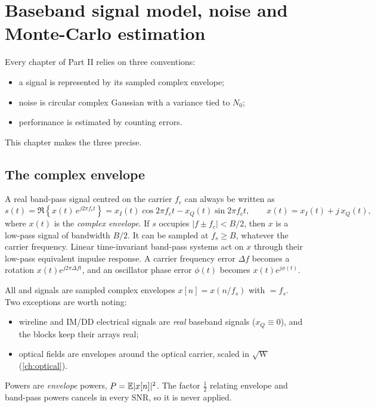 \chapter[Baseband signal model, noise and Monte-Carlo estimation]{Baseband signal model, noise and\\ Monte-Carlo estimation}\label{ch:baseband}

Every chapter of Part II relies on three conventions:
\begin{itemize}
  \item a signal is represented by its sampled complex envelope;
  \item noise is circular complex Gaussian with a variance tied to $N_0$;
  \item performance is estimated by counting errors.
\end{itemize}
This chapter makes the three precise.

\section{The complex envelope}
A real band-pass signal centred on the carrier $f_c$ can always be written as
\begin{equation}
  s(t)=\Re\!\left\{x(t)\,e^{j2\pi f_c t}\right\}=x_I(t)\cos 2\pi f_c t-x_Q(t)\sin 2\pi f_c t,
  \qquad x(t)=x_I(t)+j\,x_Q(t),
  \label{eq:envelope}
\end{equation}
where $x(t)$ is the \emph{complex envelope}. If $s$ occupies $|f\pm f_c|<B/2$, then $x$ is a
low-pass signal of bandwidth $B/2$. It can be sampled at $f_s\ge B$, whatever the carrier
frequency. Linear time-invariant band-pass systems act on $x$ through their low-pass
equivalent impulse response. A carrier frequency error $\Delta f$ becomes a rotation
$x(t)e^{j2\pi\Delta f t}$, and an oscillator phase error $\phi(t)$ becomes $x(t)e^{j\phi(t)}$.

\begin{incode}
All  and  signals are sampled complex envelopes
$x[n]=x(n/f_s)$ with $=f_s$. Two exceptions are worth noting:
\begin{itemize}
  \item wireline and IM/DD electrical signals are \emph{real} baseband signals ($x_Q\equiv0$),
  and the blocks keep their arrays real;
  \item optical fields are envelopes around the optical carrier, scaled in $\sqrt{\mathrm{W}}$
  (\cref{ch:optical}).
\end{itemize}
Powers are \emph{envelope} powers, $P=\mathbb{E}|x[n]|^2$. The factor $\tfrac12$ relating envelope and
band-pass powers cancels in every SNR, so it is never applied.
\end{incode}

